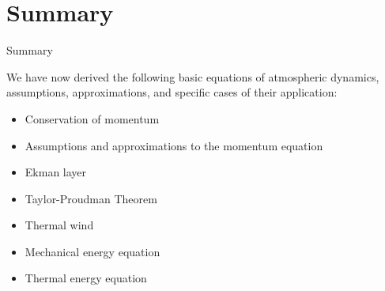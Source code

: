 \section{Summary}
\begin{frame}{Summary}

We have now derived the following basic equations of atmospheric dynamics, assumptions, approximations, and specific cases of their application:
\begin{itemize}
	\item Conservation of momentum
	\item Assumptions and approximations to the momentum equation
	\item Ekman layer
	\item Taylor-Proudman Theorem
	\item Thermal wind
	\item Mechanical energy equation
	\item Thermal energy equation
\end{itemize}
\end{frame}



